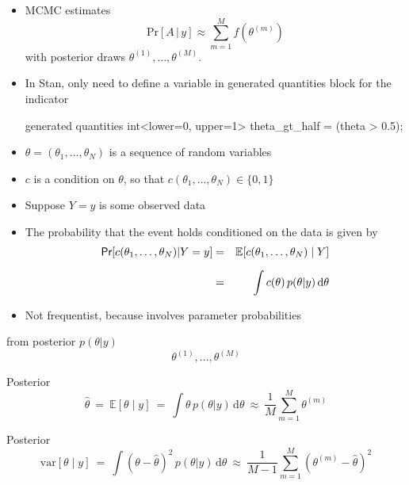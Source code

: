 \documentclass[10pt]{report}
\begin{document}
%
\begin{itemize}
\item MCMC estimates
\[
\mathrm{Pr}[A \, | \, y]
\approx
\sum_{m=1}^M f(\theta^{(m)})
\]
with posterior draws $\theta^{(1)}, \ldots, \theta^{(M)}$.
\vfill
\item In Stan, only need to define a variable in generated quantities
  block for the indicator
\begin{stancode}
generated quantities {
  int<lower=0, upper=1> theta_gt_half = (theta > 0.5);
}
\end{stancode}
\end{itemize}


%
\begin{itemize}
\item $\theta = (\theta_1, \ldots, \theta_N)$ is a sequence of
  random variables
\item $c$ is a condition on $\theta$,
  so that $c(\theta_1, \ldots, \theta_N) \in \{ 0, 1 \}$
\item Suppose $Y = y$ is some observed data
\item The probability that the event holds conditioned on the data is
  given by
%
\begin{eqnarray*}
\text{\sf Pr}[c(\theta_1, \ldots, \theta_N) | Y = y]
& = & \mathbb{E}[c(\theta_1,\ldots, \theta_N) \mid Y]
\\[6pt]
& = & \int c(\theta) \, p(\theta|y) \, \mathrm{d}\theta
\end{eqnarray*}
%
\item Not frequentist, because involves parameter probabilities
\end{itemize}

%
\begin{subitemize}
%
\item {} from posterior $p(\theta | y)$
\[
\theta^{(1)}, \ldots, \theta^{(M)}
\]
\item Posterior 
\[
\hat{\theta}
\ = \
\mathbb{E}[\theta \mid y]
\ = \
\int \theta \, p(\theta | y) \, \mathrm{d}\theta
\ \approx \
\frac{1}{M} \sum_{m=1}^M \theta^{(m)}
\]
%
\item Posterior 
\[
\mathrm{var}[\theta \mid y]
\ = \
\int (\theta - \hat{\theta})^2 \, p(\theta | y) \, \mathrm{d}\theta
\ \approx \
\frac{1}{M - 1} \sum_{m=1}^M (\theta^{(m)} - \hat{\theta})^2
\]
\end{subitemize}
\end{document}
